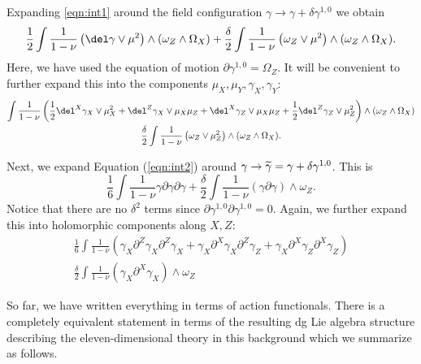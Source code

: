 \documentclass[11pt]{amsart}
\begin{document}
Expanding \eqref{eqn:int1} around the field configuration $\gamma \to \gamma + \delta \gamma^{1,0}$ we obtain
\[
  \frac12 \int \frac{1}{1-\nu} \left(\del \gamma \vee \mu^2 \right) \wedge (\omega_Z \wedge \Omega_X) + \frac{\delta}{2} \int \frac{1}{1-\nu} \left(\omega_Z \vee \mu^2 \right) \wedge (\omega_Z \wedge \Omega_X) .
\]
Here, we have used the equation of motion $\partial \gamma^{1,0} = \Omega_Z$.
It will be convenient to further expand this into the components $\mu_X, \mu_Y, \gamma_X, \gamma_Y$:
\begin{multline}
 \int \frac{1}{1-\nu} \left(\frac12 \del^X \gamma_X \vee \mu_X^2  + \del^Z \gamma_X \vee \mu_X \mu_Z + \del^X \gamma_Z \vee \mu_X\mu_Z + \frac12 \del^Z \gamma_Z \vee \mu_Z^2 \right) \wedge (\omega_Z \wedge \Omega_X) 
 \\
  \frac{\delta}{2} \int \frac{1}{1-\nu} \left(\omega_Z \vee \mu_Z^2 \right) \wedge (\omega_Z \wedge \Omega_X) .
  \label{eqn:delta1}
\end{multline}

Next, we expand Equation (\ref{eqn:int2}) around $\gamma \to \Tilde{\gamma} = \gamma + \delta \gamma^{1,0}$.
This is
\[
  \frac16 \int \frac{1}{1-\nu} \gamma \partial \gamma \partial \gamma + \frac{\delta}{2} \int \frac{1}{1-\nu} \left(\gamma \partial \gamma\right) \wedge \omega_Z .
\]
Notice that there are no $\delta^2$ terms since $\partial \gamma^{1,0} \partial \gamma^{1,0} = 0$.
Again, we further expand this into holomorphic components along $X,Z$:
\begin{multline}
\frac16 \int \frac{1}{1-\nu} \left(\gamma_X \partial^Z \gamma_X \partial^Z \gamma_X +\gamma_X \partial^X \gamma_X \partial^Z \gamma_Z +  \gamma_X \partial^X \gamma_Z \partial^X \gamma_Z \right)
\\
\frac{\delta}{2} \int \frac{1}{1-\nu} \left(\gamma_X \partial^X \gamma_X \right) \wedge \omega_Z 
\label{eqn:delta2}
\end{multline}

So far, we have written everything in terms of action functionals.
There is a completely equivalent statement in terms of the resulting dg Lie algebra structure describing the eleven-dimensional theory in this background which we summarize as follows.
\end{document}
